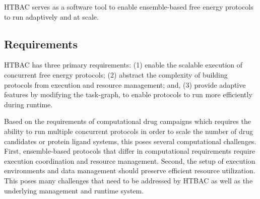 HTBAC serves as a software tool to enable ensemble-based free energy
protocols to run adaptively and at scale.





\subsection{Requirements}

HTBAC has three primary requirements: (1) enable the scalable execution of
concurrent free energy protocols; (2) abstract the complexity of building
protocols from execution and resource management; and, (3) provide adaptive
features by modifying the task-graph, to enable protocols to run more
efficiently during runtime.



Based on the requirements of computational drug campaigns  which requires the ability to
run multiple concurrent protocols in order to scale the number of drug
candidates or protein ligand systems, this poses several computational
challenges. First, ensemble-based protocols that differ in computational
requirements require execution coordination and resource management. Second,
the setup of execution environments and data management should preserve
efficient resource utilization. This poses many challenges that need to be
addressed by HTBAC as well as the underlying management and runtime system.

